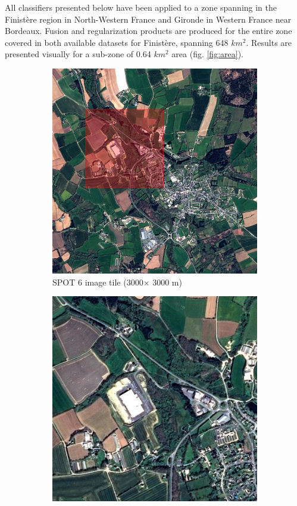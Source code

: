 \documentclass[10pt]{article}
\begin{document}
All classifiers presented below have been applied to a zone spanning in the Finistère region in North-Western France and Gironde in Western France near Bordeaux. Fusion and regularization products are produced for the entire zone covered in both available datasets for Finistère, spanning 648 $km^2$. Results are presented visually for a sub-zone of 0.64 $km^2$ area (fig.  \ref{fig:area}).
\begin{figure}[H]
    \centering
    \begin{subfigure}{0.49\textwidth}
        \centering
        \includegraphics[width=.9\textwidth]{Im_SPOT6}
        \caption{SPOT 6 image tile (3000$\times$ 3000 m)}
        \label{fig:areaBig}
    \end{subfigure}
    \hfill
    \begin{subfigure}{0.49\textwidth}
        \centering
        \includegraphics[width=.9\textwidth]{Im_SPOT6_crop}

\end{subfigure}
\end{figure}
\end{document}
